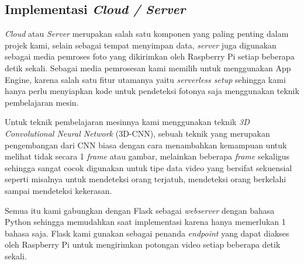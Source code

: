 \subsection{Implementasi \textit{Cloud / Server}}

\textit{Cloud} atau \textit{Server} merupakan salah satu komponen yang paling penting dalam projek kami, selain sebagai tempat menyimpan data, \textit{server} juga digunakan sebagai media pemroses foto yang dikirimkan oleh Raspberry Pi setiap beberapa detik sekali. Sebagai media pemrosesan kami memilih untuk menggunakan App Engine, karena salah satu fitur utamanya yaitu \textit{serverless setup} sehingga kami hanya perlu menyiapkan kode untuk pendeteksi fotonya saja menggunakan teknik pembelajaran mesin.

Untuk teknik pembelajaran mesinnya kami menggunakan teknik \textit{3D Convolutional Neural Network} (3D-CNN), sebuah teknik yang merupakan pengembangan dari CNN biasa dengan cara menambahkan kemampuan untuk melihat tidak secara 1 \textit{frame} atau gambar, melainkan beberapa \textit{frame} sekaligus sehingga sangat cocok digunakan untuk tipe data video yang bersifat sekuensial seperti misalnya untuk mendeteksi orang terjatuh, mendeteksi orang berkelahi sampai mendeteksi kekerasan.

Semua itu kami gabungkan dengan Flask sebagai \textit{webserver} dengan bahasa Python sehingga memudahkan saat implementasi karena hanya memerlukan 1 bahasa saja. Flask kami gunakan sebagai penanda \textit{endpoint} yang dapat diakses oleh Raspberry Pi untuk mengirimkan potongan video setiap beberapa detik sekali.
